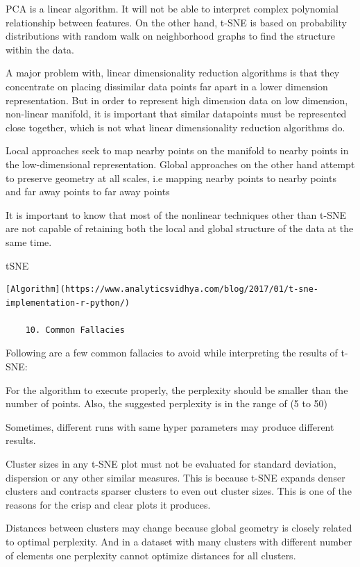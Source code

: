 \documentclass[
]{book}
\begin{document}
PCA is a linear algorithm. It will not be able to interpret complex polynomial relationship between features. On the other hand, t-SNE is based on probability distributions with random walk on neighborhood graphs to find the structure within the data.

A major problem with, linear dimensionality reduction algorithms is that they concentrate on placing dissimilar data points far apart in a lower dimension representation. But in order to represent high dimension data on low dimension, non-linear manifold, it is important that similar datapoints must be represented close together, which is not what linear dimensionality reduction algorithms do.

Local approaches seek to map nearby points on the manifold to nearby points in the low-dimensional representation. Global approaches on the other hand attempt to preserve geometry at all scales, i.e mapping nearby points to nearby points and far away points to far away points

It is important to know that most of the nonlinear techniques other than t-SNE are not capable of retaining both the local and global structure of the data at the same time.

tSNE

\begin{verbatim}
[Algorithm](https://www.analyticsvidhya.com/blog/2017/01/t-sne-implementation-r-python/)

    10. Common Fallacies
\end{verbatim}

Following are a few common fallacies to avoid while interpreting the results of t-SNE:

For the algorithm to execute properly, the perplexity should be smaller than the number of points. Also, the suggested perplexity is in the range of (5 to 50)

Sometimes, different runs with same hyper parameters may produce different results.

Cluster sizes in any t-SNE plot must not be evaluated for standard deviation, dispersion or any other similar measures. This is because t-SNE expands denser clusters and contracts sparser clusters to even out cluster sizes. This is one of the reasons for the crisp and clear plots it produces.

Distances between clusters may change because global geometry is closely related to optimal perplexity. And in a dataset with many clusters with different number of elements one perplexity cannot optimize distances for all clusters.
\end{document}

